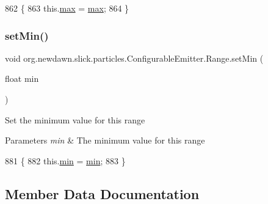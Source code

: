 \begin{DoxyCode}
862                                       \{
863             this.\mbox{\hyperlink{classorg_1_1newdawn_1_1slick_1_1particles_1_1_configurable_emitter_1_1_range_a6950c49934d7424d5ab449b3b3256ec0}{max}} = \mbox{\hyperlink{classorg_1_1newdawn_1_1slick_1_1particles_1_1_configurable_emitter_1_1_range_a6950c49934d7424d5ab449b3b3256ec0}{max}};
864         \}
\end{DoxyCode}
\mbox{\label{classorg_1_1newdawn_1_1slick_1_1particles_1_1_configurable_emitter_1_1_range_a9415104a8d734475c997be2f23e34eb5}} 
\subsubsection{\texorpdfstring{set\+Min()}{setMin()}}
{\footnotesize\ttfamily void org.\+newdawn.\+slick.\+particles.\+Configurable\+Emitter.\+Range.\+set\+Min (\begin{DoxyParamCaption}\item[{float}]{min }\end{DoxyParamCaption})\hspace{0.3cm}{\ttfamily [inline]}}

Set the minimum value for this range


\begin{DoxyParams}{Parameters}
{\em min} & The minimum value for this range \\
\hline
\end{DoxyParams}

\begin{DoxyCode}
881                                       \{
882             this.\mbox{\hyperlink{classorg_1_1newdawn_1_1slick_1_1particles_1_1_configurable_emitter_1_1_range_a863382f93996d8d07cea741bea1fb9a9}{min}} = \mbox{\hyperlink{classorg_1_1newdawn_1_1slick_1_1particles_1_1_configurable_emitter_1_1_range_a863382f93996d8d07cea741bea1fb9a9}{min}};
883         \}
\end{DoxyCode}


\subsection{Member Data Documentation}
\mbox{\label{classorg_1_1newdawn_1_1slick_1_1particles_1_1_configurable_emitter_1_1_range_a8e14b5a19b817ff49fb52b9d3dd303ce}} 
